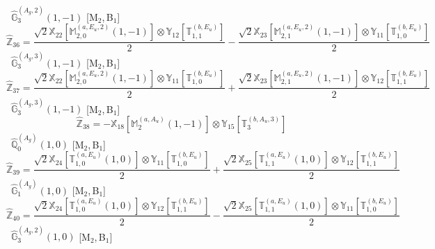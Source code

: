 \documentclass[fleqn,10pt,landscape]{article}
\begin{document}
\begin{itemize}
\begin{dmath*}
\end{dmath*}
\vspace{4mm}
\noindent {} $\,\,\,\hat{\mathbb{G}}_{3}^{(A_{g},2)}(1,-1)$ [M$_{2}$,\,B$_{1}$]
\begin{dmath*}
\hat{\mathbb{Z}}_{36}=\frac{\sqrt{2} \mathbb{X}_{22}[\mathbb{M}_{2,0}^{(a,E_{u},2)}(1,-1)] \otimes\mathbb{Y}_{12}[\mathbb{T}_{1,1}^{(b,E_{u})}]}{2} - \frac{\sqrt{2} \mathbb{X}_{23}[\mathbb{M}_{2,1}^{(a,E_{u},2)}(1,-1)] \otimes\mathbb{Y}_{11}[\mathbb{T}_{1,0}^{(b,E_{u})}]}{2}
\end{dmath*}
\vspace{4mm}
\noindent {} $\,\,\,\hat{\mathbb{G}}_{3}^{(A_{g},3)}(1,-1)$ [M$_{2}$,\,B$_{1}$]
\begin{dmath*}
\hat{\mathbb{Z}}_{37}=\frac{\sqrt{2} \mathbb{X}_{22}[\mathbb{M}_{2,0}^{(a,E_{u},2)}(1,-1)] \otimes\mathbb{Y}_{11}[\mathbb{T}_{1,0}^{(b,E_{u})}]}{2} + \frac{\sqrt{2} \mathbb{X}_{23}[\mathbb{M}_{2,1}^{(a,E_{u},2)}(1,-1)] \otimes\mathbb{Y}_{12}[\mathbb{T}_{1,1}^{(b,E_{u})}]}{2}
\end{dmath*}
\vspace{4mm}
\noindent {} $\,\,\,\hat{\mathbb{G}}_{3}^{(A_{g},3)}(1,-1)$ [M$_{2}$,\,B$_{1}$]
\begin{dmath*}
\hat{\mathbb{Z}}_{38}=- \mathbb{X}_{18}[\mathbb{M}_{2}^{(a,A_{u})}(1,-1)] \otimes\mathbb{Y}_{15}[\mathbb{T}_{3}^{(b,A_{u},3)}]
\end{dmath*}
\vspace{4mm}
\noindent {} $\,\,\,\hat{\mathbb{Q}}_{0}^{(A_{g})}(1,0)$ [M$_{2}$,\,B$_{1}$]
\begin{dmath*}
\hat{\mathbb{Z}}_{39}=\frac{\sqrt{2} \mathbb{X}_{24}[\mathbb{T}_{1,0}^{(a,E_{u})}(1,0)] \otimes\mathbb{Y}_{11}[\mathbb{T}_{1,0}^{(b,E_{u})}]}{2} + \frac{\sqrt{2} \mathbb{X}_{25}[\mathbb{T}_{1,1}^{(a,E_{u})}(1,0)] \otimes\mathbb{Y}_{12}[\mathbb{T}_{1,1}^{(b,E_{u})}]}{2}
\end{dmath*}
\vspace{4mm}
\noindent {} $\,\,\,\hat{\mathbb{G}}_{1}^{(A_{g})}(1,0)$ [M$_{2}$,\,B$_{1}$]
\begin{dmath*}
\hat{\mathbb{Z}}_{40}=\frac{\sqrt{2} \mathbb{X}_{24}[\mathbb{T}_{1,0}^{(a,E_{u})}(1,0)] \otimes\mathbb{Y}_{12}[\mathbb{T}_{1,1}^{(b,E_{u})}]}{2} - \frac{\sqrt{2} \mathbb{X}_{25}[\mathbb{T}_{1,1}^{(a,E_{u})}(1,0)] \otimes\mathbb{Y}_{11}[\mathbb{T}_{1,0}^{(b,E_{u})}]}{2}
\end{dmath*}
\vspace{4mm}
\noindent {} $\,\,\,\hat{\mathbb{G}}_{3}^{(A_{g},2)}(1,0)$ [M$_{2}$,\,B$_{1}$]

\end{itemize}
\end{document}
